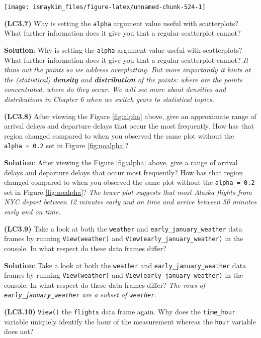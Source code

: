 \documentclass[12pt,]{krantz}
\theoremstyle{definition}
\theoremstyle{definition}
\theoremstyle{definition}
\theoremstyle{remark}
\begin{document}
\begin{center}\texttt{[image: ismaykim\_files/figure-latex/unnamed-chunk-524-1]} \end{center}

\textbf{(LC3.7)} Why is setting the \texttt{alpha} argument value useful
with scatterplots? What further information does it give you that a
regular scatterplot cannot?

\textbf{Solution}: Why is setting the \texttt{alpha} argument value
useful with scatterplots? What further information does it give you that
a regular scatterplot cannot? \emph{It thins out the points so we
address overplotting. But more importantly it hints at the (statistical)
\textbf{density} and \textbf{distribution} of the points: where are the
points concentrated, where do they occur. We will see more about
densities and distributions in Chapter 6 when we switch gears to
statistical topics.}

\textbf{(LC3.8)} After viewing the Figure \ref{fig:alpha} above, give an
approximate range of arrival delays and departure delays that occur the
most frequently. How has that region changed compared to when you
observed the same plot without the \texttt{alpha\ =\ 0.2} set in Figure
\ref{fig:noalpha}?

\textbf{Solution}: After viewing the Figure \ref{fig:alpha} above, give
a range of arrival delays and departure delays that occur most
frequently? How has that region changed compared to when you observed
the same plot without the \texttt{alpha\ =\ 0.2} set in Figure
\ref{fig:noalpha}? \emph{The lower plot suggests that most Alaska
flights from NYC depart between 12 minutes early and on time and arrive
between 50 minutes early and on time.}

\textbf{(LC3.9)} Take a look at both the \texttt{weather} and
\texttt{early\_january\_weather} data frames by running
\texttt{View(weather)} and \texttt{View(early\_january\_weather)} in the
console. In what respect do these data frames differ?

\textbf{Solution}: Take a look at both the \texttt{weather} and
\texttt{early\_january\_weather} data frames by running
\texttt{View(weather)} and \texttt{View(early\_january\_weather)} in the
console. In what respect do these data frames differ? \emph{The rows of
\texttt{early\_january\_weather} are a subset of \texttt{weather}.}

\textbf{(LC3.10)} \texttt{View()} the \texttt{flights} data frame again.
Why does the \texttt{time\_hour} variable uniquely identify the hour of
the measurement whereas the \texttt{hour} variable does not?
\end{document}
